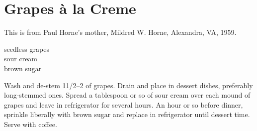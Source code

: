 \section{Grapes \`{a} la Creme}

\begin{open}
    This is from Paul Horne's mother, Mildred W. Horne, Alexandra, VA, 1959.
\end{open}
\begin{ingredients}
    seedless grapes\\
    sour cream\\
    brown sugar\\
\end{ingredients}
Wash and de-stem 1\SIrange{1/2}{2}{\pound} of grapes. Drain and place in dessert
dishes, preferably long-stemmed ones.  Spread a tablespoon or so of sour cream
over each mound of grapes and leave in refrigerator for several hours.  An hour
or so before dinner, sprinkle liberally with brown sugar and replace in
refrigerator until dessert time.  Serve with coffee.
